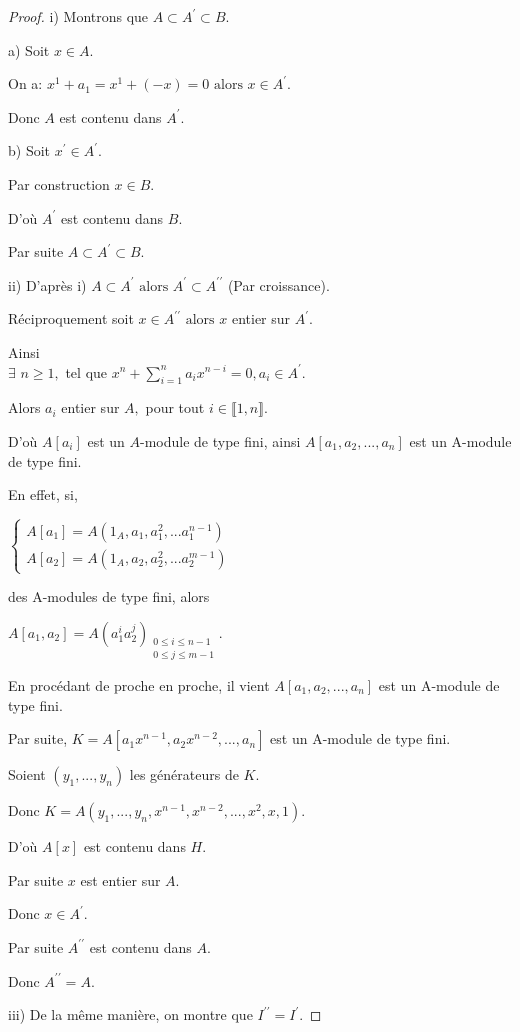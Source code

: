 \begin{proof}
	i) Montrons que $A\subset A^{\prime }\subset B$.
	
	a) Soit $x\in A.$
	
	On a: $x^{1}+a_{1}=x^{1}+(-x)=0\text{ alors } x\in A^{\prime }.$
	
	Donc $A$ est contenu dans $ A^{\prime }.$
	
	b) Soit $x^{\prime }\in A^{\prime }.$ 
	
	Par construction $x\in B.$
	
	D'où $A^{\prime }$ est contenu dans $ B.$
	
	Par suite $A \subset A^{\prime }\subset B$.
	
	ii) D'après i) $A\subset A^{\prime }\text{ alors } A^{\prime }\subset
	A^{\prime \prime }$ (Par croissance).
	
	Réciproquement soit $x\in A^{\prime \prime }\text{ alors } x$ entier sur $
	A^{\prime }$.
	
	Ainsi \\ $\exists$  $n\geq 1,$ tel que  $x^{n}+\sum
	\limits_{i=1}^{n}a_{i}x^{n-i}=0,a_{i}\in A^{\prime }.$
	
	Alors $a_{i}$ entier sur $A,$ pour tout $i\in \llbracket 1, n \rrbracket.$
	
	D'où $A[a_{i}]$ est un $A$-module de type fini, ainsi $A[a_{1},a_{2},...,a_{n}]$ est un A-module de type fini.
	
	En effet, si,
	
	$\left\{ 
	\begin{array}{c}
		A[a_{1}]=A(1_{A},a_{1},a_{1}^{2},...a_{1}^{n-1}) \\ 
		A[a_{2}]=A(1_{A},a_{2},a_{2}^{2},...a_{2}^{m-1})
	\end{array}
	\right. $
	
	des A-modules de type fini, alors 
	
	$A[a_{1},a_{2}]=A(a_{1}^{i}a_{2}^{j})_{\substack{ 0\leq i\leq n-1 \\ 0\leq
			j\leq m-1}}$.
	
	En procédant de proche en proche, il vient $A[a_{1},a_{2},...,a_{n}]$
	est un A-module de type fini.
	
	Par suite, $K=A[a_{1}x^{n-1},a_{2}x^{n-2},...,a_{n}]$ est un A-module de
	type fini.
	
	Soient $(y_{1},...,y_{n})$ les générateurs de $K.$
	
	Donc $K=A(y_{1},...,y_{n},x^{n-1},x^{n-2},...,x^{2},x,1)$.
	
	D'où $A[x]$ est contenu dans $ H.$
	
	Par suite $x$ est entier sur $A$.
	
	Donc $x\in A^{\prime }$.
	
	Par suite $A^{\prime \prime }$ est contenu dans $ A$.
	
	Donc  $A^{\prime \prime }=A$.
	
	iii) De la même manière, on montre que $I^{\prime \prime }=I^{\prime}.$
\end{proof}
